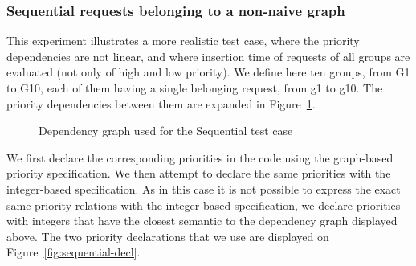 \documentclass[11pt]{report}
\begin{document}
\subsubsection{Sequential requests belonging to a non-naive graph}
This experiment illustrates a more realistic test case, where the priority dependencies are not linear, and where insertion time of requests of all groups are evaluated (not only of high and low priority). We define here ten groups, from G1 to G10, each of them having a single belonging request, from g1 to g10. The priority dependencies between them are expanded in Figure~\ref{fig:complex}.

\begin{figure}[!ht]
      \caption{Dependency graph used for the Sequential test case}
      \label{fig:complex} 
\end{figure}

We first declare the corresponding priorities in the code using the graph-based priority specification. We then attempt to declare the same priorities with the integer-based specification. As in this case it is not possible to express the exact same priority relations with the integer-based specification, we declare priorities with integers that have the closest semantic to the dependency graph displayed above. The two priority declarations that we use are displayed on Figure~\ref{fig:sequential-decl}.
\end{document}
